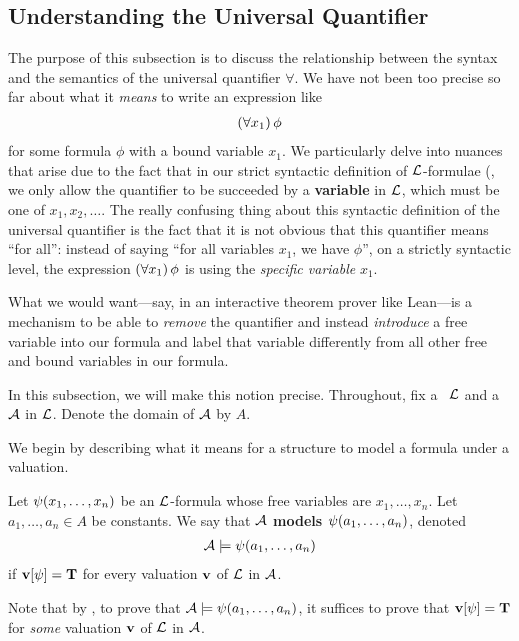 \subsection{Understanding the Universal Quantifier}

The purpose of this subsection is to discuss the relationship between the syntax and the semantics of the universal quantifier $\forall$. We have not been too precise so far about what it \textit{means} to write an expression like
\begin{align*}
    \left( \forall x_1 \right)\phi
\end{align*}
for some formula $\phi$ with a bound variable $x_1$. We particularly delve into nuances that arise due to the fact that in our strict syntactic definition of $\mathcal{L}$-formulae (, we only allow the quantifier to be succeeded by a \textbf{variable} in $\mathcal{L}$, which must be one of $x_1, x_2, \ldots$. The really confusing thing about this syntactic definition of the universal quantifier is the fact that it is not obvious that this quantifier means ``for all'': instead of saying ``for all variables $x_1$, we have $\phi$'', on a strictly syntactic level, the expression $\left( \forall x_1 \right)\phi$ is using the \textit{specific variable} $x_1$.

What we would want---say, in an interactive theorem prover like Lean---is a mechanism to be able to \textit{remove} the quantifier and instead \textit{introduce} a free variable into our formula and label that variable differently from all other free and bound variables in our formula.

In this subsection, we will make this notion precise. Throughout, fix a \fola\ $\mathcal{L}$ and a \fos\ $\mathcal{A}$ in $\mathcal{L}$. Denote the domain of $\mathcal{A}$ by $A$.

We begin by describing what it means for a structure to model a formula under a valuation.

\begin{boxdefinition}
    Let $\psi\!\left( x_1, \ldots, x_n \right)$ be an $\mathcal{L}$-formula whose free variables are $x_1, \ldots, x_n$. Let $a_1, \ldots, a_n \in A$ be constants. We say that \textbf{$\mathcal{A}$ models $\psi\!\left( a_1, \ldots, a_n \right)$}, denoted
    \begin{align*}
        \mathcal{A} \models \psi\!\left( a_1, \ldots, a_n \right)
    \end{align*}
    if $\mathbf{v}\!\left[ \psi \right] = \mathbf{T}$ for every valuation $\mathbf{v}$ of $\mathcal{L}$ in $\mathcal{A}$.
\end{boxdefinition}
Note that by , to prove that $\mathcal{A} \models \psi\!\left( a_1, \ldots, a_n \right)$, it suffices to prove that $\mathbf{v}\!\left[ \psi \right] = \mathbf{T}$ for \textit{some} valuation $\mathbf{v}$ of $\mathcal{L}$ in $\mathcal{A}$.

